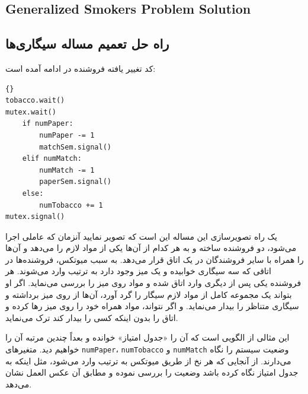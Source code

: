 \documentclass{book}
\begin{document}
\subsection{Generalized Smokers Problem Solution}
\subsection{راه حل تعمیم مساله سیگاری‌ها}
\label{smoker}

    کد تغییر یافته فروشنده  در ادامه آمده است: 

\begin{latin}
\begin{latin}
\begin{lstlisting}[title={\rl{فروشنده} A}]{}
tobacco.wait()
mutex.wait()
    if numPaper:
        numPaper -= 1
        matchSem.signal()
    elif numMatch:
        numMatch -= 1
        paperSem.signal()
    else: 
        numTobacco += 1
mutex.signal()
\end{lstlisting}
\end{latin}
\end{latin}

    یک راه تصویرسازی این مساله این است که تصویر نمایید آنزمان که عاملی اجرا می‌شود‌، دو فروشنده ساخته و به هر کدام از آن‌ها یکی از مواد لازم را 
    می‌دهد و آن‌ها را همراه با سایر فروشندگان در یک اتاق قرار می‌دهد. به سبب میوتکس، فروشنده‌ها در اتاقی که سه سیگاری خوابیده و یک میز وجود دارد 
    به ترتیب وارد می‌شوند. هر فروشنده یکی پس از دیگری وارد اتاق شده و مواد روی میز را بررسی می‌نماید. اگر او بتواند یک مجموعه کامل از مواد لازم سیگار را
    گرد آورد، آن‌ها از روی میز برداشته و سیگاری متناظر را بیدار می‌نماید. و اگر نتواند،‌ مواد همراه خود را روی میز رها کرده و اتاق را بدون اینکه کسی را 
    بیدار کند ترک می‌نماید. 

    این مثالی از الگویی است که آن را «جدول امتیاز» خوانده و بعداً چندین مرتبه آن را خواهیم دید.   
    متغیرهای     {\tt numPaper}، {\tt numTobacco} و  {\tt numMatch}    وضعیت سیستم را نگاه می‌دارند. 
    از آنجایی که هر نخ از طریق میوتکس به ترتیب وارد می‌شود، مثل اینکه به جدول امتیاز نگاه کرده باشد وضعیت را بررسی نموده و مطابق آن عکس العمل نشان می‌دهد. 
\end{document}
